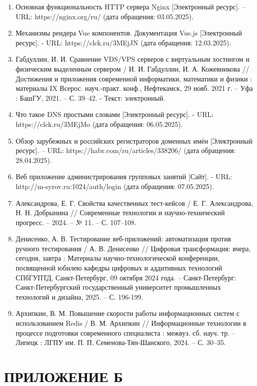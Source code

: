 \documentclass[a4paper,14pt,oneside]{extreport}
\begin{document}
\begin{enumerate}
    \item Основная функциональность HTTP сервера Nginx [Электронный ресурс]. – URL: https://nginx.org/ru/ (дата обращения: 03.05.2025).
    \item Механизмы рендера Vue компонентов. Документация Vue.js [Электронный ресурс]. - URL: https://clck.ru/3MEjJN (дата обращения: 12.03.2025).
    \item Габдуллин, И. И. Сравнение VDS/VPS серверов с виртуальным хостингом и физическим выделенным сервером / И. И. Габдуллин, И. А. Кожевникова // Достижения и приложения современной информатики, математики и физики : материалы IX Всерос. науч.-практ. конф., Нефтекамск, 29 нояб. 2021 г. – Уфа : БашГУ, 2021. – С. 39–42. - Текст: электронный.
    \item Что такое DNS простыми словами [Электронный ресурс]. - URL: https://clck.ru/3MEjMo (дата обращения: 06.05.2025).
    \item Обзор зарубежных и российских регистраторов доменных имён [Электронный ресурс]. – URL: https://habr.com/ru/articles/338206/ (дата обращения: 28.04.2025).
    \item Веб приложение администрирования групповых занятий [Сайт]. - URL: http://m-syrov.ru:1024/auth/login (дата обращения: 07.05.2025).
    \item Александрова, Е. Г. Свойства качественных тест-кейсов / Е. Г. Александрова, Н. Н. Добрынина // Современные технологии и научно-технический прогресс. – 2024. – № 11. – С. 107–108.
    \item Денисенко, А. В. Тестирование веб-приложений: автоматизация против ручного тестирования / А. В. Денисенко // Цифровая трансформация: вчера, сегодня, завтра : Материалы научно-технологической конференции, посвященной юбилею кафедры цифровых и аддитивных технологий СПбГУПТД, Санкт-Петербург, 09 октября 2024 года. – Санкт-Петербург: Санкт-Петербургский государственный университет промышленных технологий и дизайна, 2025. – С. 196-199.
   \item Архипкин, В. М. Повышение скорости работы информационных систем с использованием Redis / В. М. Архипкин // Информационные технологии в процессе подготовки современного специалиста : межвуз. сб. науч. тр. – Липецк : ЛГПУ им. П. П. Семенова-Тян-Шанского, 2024. – С. 30–35.
\end{enumerate}

\newpage
{}
 

\chapter*{ПРИЛОЖЕНИЕ Б}
\end{document}
